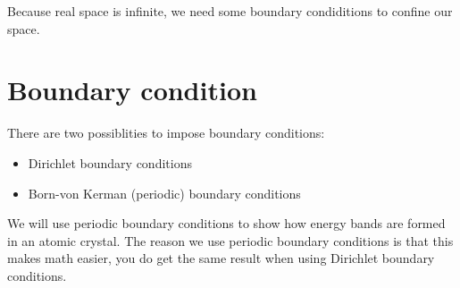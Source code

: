 Because real space is infinite, we need some boundary condiditions to confine our space.
\section{Boundary condition}
There are two possiblities to impose boundary conditions:
\begin{itemize}
	\setlength\itemsep{0pt}
	\item Dirichlet boundary conditions
	\item Born-von Kerman (periodic) boundary conditions
\end{itemize}
We will use periodic boundary conditions to show how energy bands are formed in an atomic crystal. The reason we use periodic boundary conditions is that this makes math easier, you do get the same result when using Dirichlet boundary conditions.
